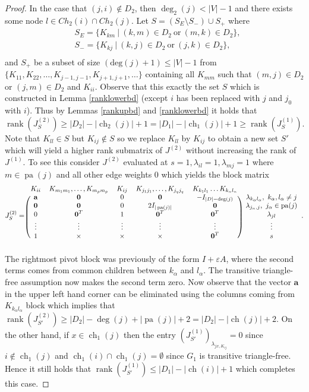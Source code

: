 \documentclass[12pt,reqno]{amsart}
\theoremstyle{plain}
\theoremstyle{definition}
\DeclareMathOperator{\pa}{pa}
\DeclareMathOperator{\ch}{ch}
\DeclareMathOperator{\rank}{rank}
\begin{document}
\begin{proof}
In the case that $(j,i)\notin D_2$, then $\deg_2(j)<|V|-1$ and there exists some node $l\in Ch_2(i)\cap Ch_2(j)$. Let $S = (S_E \setminus S_-) \cup S_+$ where
\begin{align*}
&S_E = \{K_{km} ~|~ (k, m) \in D_2 ~\mathrm{or}~ (m, k) \in D_2\}, \\
&S_- = \{K_{kj} ~|~ (k, j) \in D_2 ~\mathrm{or}~ (j, k) \in D_2\}, \\
\end{align*}
and $S_+$ be a subset of size $(\text{deg}(j)+1)\leq |V|-1$ from $\{K_{11},K_{22},\ldots, K_{j-1,j-1},K_{j+1,j+1},\ldots\}$ containing all $K_{m m}$ such that $(m,j)\in D_2$ or $(j, m)\in D_2$ and $K_{ii}$. Observe that this exactly the set $S$ which is constructed in Lemma \ref{ranklowerbd} (except $i$ has been replaced with $j$ and $j_0$ with $i$). Thus by Lemmas \ref{rankupbd} and \ref{ranklowerbd} it holds that
$$
\rank(J^{(2)}_S) \geq |D_2|-|\ch_2(j)|+1=|D_1|-|\ch_1(j)|+1 \geq \rank(J^{(1)}_S).
$$
Note that $K_{ll}\in S$ but $K_{ij}\notin S$ so we replace $K_{ll}$ by $K_{ij}$ to obtain a new set $S'$ which will yield a higher rank submatrix of $J^{(2)}$ without increasing the rank of $J^{(1)}$. To see this consider $J^{(2)}$ evaluated at $s=1,\lambda_{il}=1, \lambda_{mj}=1$ where $m \in \pa(j)$ and all other edge weights $0$ which yields the block matrix
\begin{align}\label{ttf_J2}
J^{(2)}_S=
\begin{blockarray}{cccccc}
K_{ii} & K_{m_1 m_1}, \ldots, K_{m_p m_p} & K_{ij} & K_{j_1 j_1 }, \ldots, K_{j_q j_q} & K_{k_1 l_1} \ldots K_{k_n l_n}\\
\begin{block}{(ccccc)c}
\textbf{a} & \mathbf{0} & 0 & \mathbf{0} & -I_{|D|-\text{deg}(j)} & \lambda_{k_\alpha l_\alpha},~ k_\alpha, l_\alpha \neq j\\
\textbf{0} & \mathbf{0} & 0 &  2I_{|\pa(j)|} & \mathbf{0} & \lambda_{j_\alpha,j},~ j_\alpha \in \pa(j)\\
0 & \textbf{0}^T & 1 & \textbf{0}^T & \textbf{0}^T & \lambda_{jl}\\
\vdots & \vdots & \vdots & \vdots & \vdots & \vdots\\
1 & \times & \times & \times & \textbf{0}^T & s\\
\end{block}
\end{blockarray}.
\end{align}
The rightmost pivot block was previously of the form $I+\varepsilon A$, where the second terms comes from common children between $k_\alpha$ and $l_\alpha$. The transitive triangle-free assumption now makes the second term zero. Now observe that the vector $\textbf{a}$ in the upper left hand corner can be eliminated using the columns coming from $K_{k_\alpha l_\alpha}$ block which implies that
$\rank(J^{(2)}_{S'}) \geq |D_2| - \deg(j) + |\pa(j)|  + 2 = |D_2| - |\ch(j)| + 2$. 
On the other hand, if $x \in \ch_1(j)$ then the entry $(J^{(1)}_{S'})_{\lambda_{jx, K_{ij}}} =0$ since $i \notin \ch_1(j)$ and $\ch_1(i) \cap \ch_1(j) = \emptyset$ since $G_1$ is transitive triangle-free. Hence it still holds that $\rank(J^{(1)}_{S'}) \leq |D_1| - |\ch(i)| + 1$ which completes this case. 


\end{proof}
\end{document}
